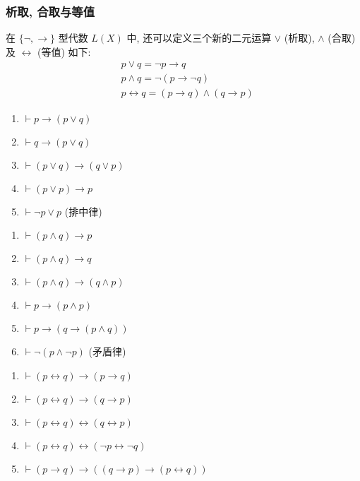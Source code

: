 \documentclass[
    color=black,
    device=normal,
    lang=cn
]{elegantnote}
\begin{document}
\subsubsection{析取, 合取与等值}
在 $\{\lnot,\to\}$ 型代数 $L(X)$ 中, 还可以定义三个新的二元运算 $\lor$ (析取), $\land$ (合取) 及 $\leftrightarrow$ (等值) 如下:
\begin{align*}
     & p\lor q=\lnot p\to q                      \\
     & p\land q=\lnot( p\to \lnot q)             \\
     & p\leftrightarrow q=(p\to q)\land (q\to p)
\end{align*}
\begin{proposition}[析取相关]
    \begin{enumerate}[label=$\arabic*^\circ$, topsep = -1em]
        \item $\vdash p\to (p\lor q)$
        \item $\vdash q\to (p\lor q)$
        \item $\vdash (p\lor q)\to (q\lor p)$
        \item $\vdash (p\lor p)\to p$
        \item $\vdash \lnot p\lor p$ (排中律)
    \end{enumerate}
\end{proposition}
\begin{proposition}[合取相关]
    \begin{enumerate}[label=$\arabic*^\circ$, topsep = -1em]
        \item $\vdash (p\land q)\to p$
        \item $\vdash (p\land q)\to q$
        \item $\vdash (p\land q)\to (q\land p)$
        \item $\vdash p\to (p\land p)$
        \item $\vdash p\to (q\to (p\land q))$
        \item $\vdash \lnot (p\land \lnot p)$ (矛盾律)
    \end{enumerate}
\end{proposition}
\begin{proposition}[等值相关]
    \begin{enumerate}[label=$\arabic*^\circ$, topsep = -1em]
        \item $\vdash (p\leftrightarrow q)\to (p\to q)$
        \item $\vdash (p\leftrightarrow q)\to (q\to p)$
        \item $\vdash (p\leftrightarrow q)\leftrightarrow (q \leftrightarrow p)$
        \item $\vdash (p\leftrightarrow q)\leftrightarrow (\lnot p\leftrightarrow\lnot q)$
        \item $\vdash (p\to q)\to ((q\to p)\to (p\leftrightarrow q))$
    \end{enumerate}
\end{proposition}
\end{document}

